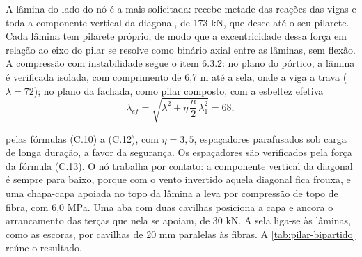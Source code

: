A lâmina do lado do nó é a mais solicitada: recebe metade das reações das vigas
e toda a componente vertical da diagonal, de 173 kN, que desce até o seu
pilarete. Cada lâmina tem pilarete próprio, de modo que a excentricidade dessa
força em relação ao eixo do pilar se resolve como binário axial entre as lâminas,
sem flexão. A compressão com instabilidade segue o item 6.3.2: no plano do
pórtico, a lâmina é verificada isolada, com comprimento de 6,7 m até a sela,
onde a viga a trava ($\lambda = 72$); no plano da fachada, como pilar composto,
com a esbeltez efetiva
\begin{equation}
    \lambda_{ef} = \sqrt{\lambda^2 + \eta\,\frac{n}{2}\,\lambda_1^2} = 68,
    \label{eq:lambda-ef-bipartido}
\end{equation}

\noindent
pelas fórmulas (C.10) a (C.12), com $\eta = 3{,}5$, espaçadores parafusados sob
carga de longa duração, a favor da segurança. Os espaçadores são verificados
pela força da fórmula (C.13). O nó trabalha por contato: a componente vertical da
diagonal é sempre para baixo, porque com o vento invertido aquela diagonal fica
frouxa, e uma chapa-capa apoiada no topo da lâmina a leva por compressão de topo
de fibra, com 6,0 MPa. Uma aba com duas cavilhas posiciona a capa e ancora o
arrancamento das terças que nela se apoiam, de 30 kN. A sela liga-se às lâminas,
como as escoras, por cavilhas de 20 mm paralelas às fibras. A \autoref{tab:pilar-bipartido}
reúne o resultado.


